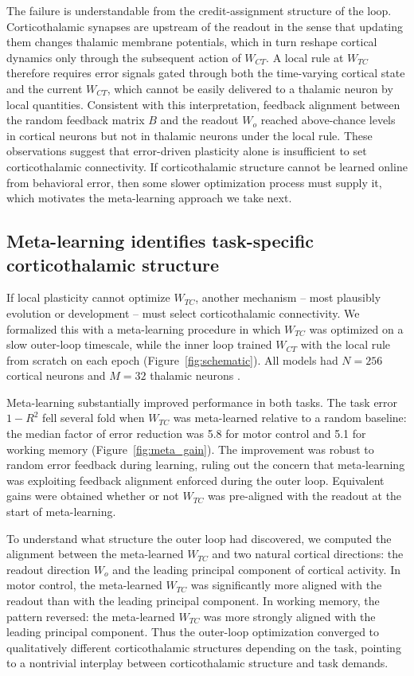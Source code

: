 \documentclass[11pt]{article}
\begin{document}
The failure is understandable from the credit-assignment structure of
the loop. Corticothalamic synapses are upstream of the readout in the
sense that updating them changes thalamic membrane potentials, which
in turn reshape cortical dynamics only through the subsequent action
of $W_{CT}$. A local rule at $W_{TC}$ therefore requires error signals
gated through both the time-varying cortical state and the current
$W_{CT}$, which cannot be easily delivered to a thalamic neuron by
local quantities. Consistent with this interpretation, feedback
alignment between the random feedback matrix $B$ and the readout
$W_o$ reached above-chance levels in cortical neurons but not in
thalamic neurons under the local rule. These observations suggest that
error-driven plasticity alone is insufficient to set corticothalamic
connectivity. If corticothalamic structure cannot be learned online
from behavioral error, then some slower optimization process must
supply it, which motivates the meta-learning approach we take next.

\subsection{Meta-learning identifies task-specific corticothalamic structure}

If local plasticity cannot optimize $W_{TC}$, another mechanism --
most plausibly evolution or development -- must select corticothalamic
connectivity. We formalized this with a meta-learning procedure in
which $W_{TC}$ was optimized on a slow outer-loop timescale, while the
inner loop trained $W_{CT}$ with the local rule from scratch on each
epoch (Figure~\ref{fig:schematic}). All models had $N = 256$ cortical
neurons and $M = 32$ thalamic neurons
\cite{wang2018prefrontal, hospedales2022meta}.

Meta-learning substantially improved performance in both tasks. The
task error $1 - R^2$ fell several fold when $W_{TC}$ was
meta-learned relative to a random baseline: the median factor of
error reduction was 5.8 for motor control and 5.1 for working memory
(Figure~\ref{fig:meta_gain}). The improvement was robust to random
error feedback during learning, ruling out the concern that
meta-learning was exploiting feedback alignment enforced during the
outer loop. Equivalent gains were obtained whether or not $W_{TC}$ was
pre-aligned with the readout at the start of meta-learning.

To understand what structure the outer loop had discovered, we
computed the alignment between the meta-learned $W_{TC}$ and two
natural cortical directions: the readout direction $W_o$ and the
leading principal component of cortical activity. In motor control,
the meta-learned $W_{TC}$ was significantly more aligned with the
readout than with the leading principal component. In working memory,
the pattern reversed: the meta-learned $W_{TC}$ was more strongly
aligned with the leading principal component. Thus the outer-loop
optimization converged to qualitatively different corticothalamic
structures depending on the task, pointing to a nontrivial interplay
between corticothalamic structure and task demands.
\end{document}
